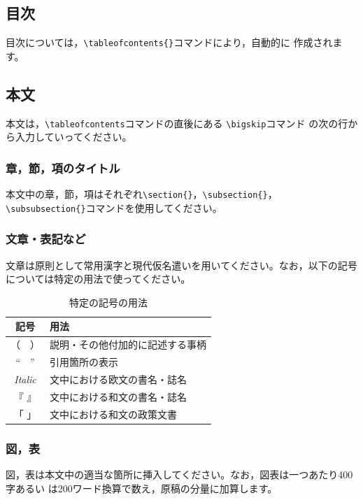\documentclass[b5paper,10pt,twocolumn,tombow]{jarticle}
\begin{document}
\subsection{目次}
目次については，\verb|\tableofcontents{}|コマンドにより，自動的に
作成されます。
\subsection{本文}
本文は，\verb|\tableofcontents|コマンドの直後にある
\verb|\bigskip|コマンド
の次の行から入力していってください。
\subsubsection{章，節，項のタイトル}
本文中の章，節，項はそれぞれ\verb|\section{}|，\verb|\subsection{}|，
\verb|\subsubsection{}|コマンドを使用してください。

\subsubsection{文章・表記など}
文章は原則として常用漢字と現代仮名遣いを用いてください。なお，以下の記号
については特定の用法で使ってください。
\begin{table}[h!]
  \center
  \caption{特定の記号の用法}
  \small
  \begin{tabular}{cl}
    \toprule
    記号 & 用法 \\
    \midrule
    （　） & 説明・その他付加的に記述する事柄 \\
    ``　'' & 引用箇所の表示 \\
    \textit{Italic} & 文中における欧文の書名・誌名 \\
    『 』 & 文中における和文の書名・誌名 \\
    「 」 & 文中における和文の政策文書 \\
    \bottomrule
  \end{tabular}
\end{table}
\normalsize


\subsubsection{図，表}
図，表は本文中の適当な箇所に挿入してください。なお，図表は一つあたり400字あるい
は200ワード換算で数え，原稿の分量に加算します。
\end{document}
